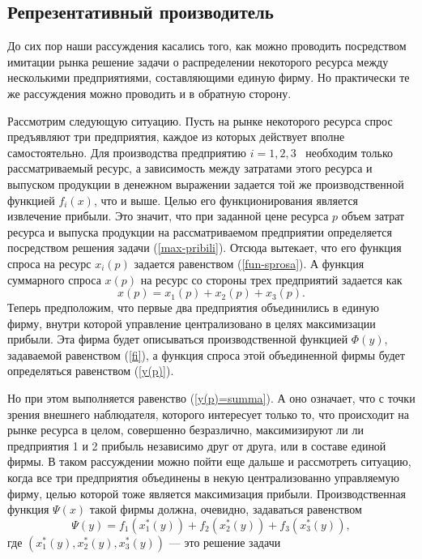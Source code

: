 \subsection{Репрезентативный производитель}

 До сих пор наши рассуждения касались того, как можно проводить
 посредством имитации рынка  решение задачи о распределении
 некоторого ресурса между несколькими
 предприятиями, составляющими единую фирму.
 Но практически те же рассуждения можно проводить и в обратную
 сторону.

 Рассмотрим следующую ситуацию. Пусть на рынке некоторого
  ресурса спрос предъявляют три
 предприятия, каждое из которых действует вполне самостоятельно.
 Для производства предприятию $i=1,2,3$ \ необходим только
 рассматриваемый ресурс, а зависимость между затратами этого ресурса
 и выпуском продукции в денежном выражении задается той же
 производственной функцией $f_{i}(x)$, что и выше. Целью его
 функционирования является извлечение прибыли. Это значит, что при
 заданной цене ресурса $p$ объем затрат ресурса и выпуска продукции
  на рассматриваемом предприятии определяется посредством решения
  задачи (\ref{max-pribili}). Отсюда вытекает, что его функция спроса
  на ресурс $x_{i}(p)$ задается равенством (\ref{fun-sprosa}). А
  функция суммарного спроса $x(p)$ на ресурс со стороны трех предприятий
  задается как
\begin{equation}
\label{summ spros}
  x(p)=x_{1}(p)+x_{2}(p)+x_{3}(p).
\end{equation}
  Теперь предположим, что первые два предприятия объединились в
  единую фирму, внутри которой управление централизовано в целях
  максимизации прибыли. Эта фирма будет описываться производственной
  функцией $\Phi(y)$, задаваемой равенством (\ref{fi}), а функция
  спроса этой объединенной фирмы будет определяться равенством
  (\ref{y(p)}).

  Но при этом выполняется равенство (\ref{y(p)=summa}). А оно означает,
  что с точки зрения внешнего наблюдателя, которого
  интересует только то, что происходит на рынке ресурса в целом,
  совершенно безразлично, максимизируют ли ли предприятия 1 и 2
  прибыль независимо друг от друга, или в составе единой фирмы. В
  таком рассуждении можно пойти еще дальше и рассмотреть ситуацию,
  когда все три предприятия объединены в некую централизованно
  управляемую фирму, целью которой тоже является максимизация
  прибыли. Производственная функция $\Psi(x)$ такой фирмы должна,
  очевидно, задаваться равенством
   \[\Psi(y)=f_{1}(x_{1}^{*}(y))+f_{2}(x_{2}^{*}(y))+f_{3}(x_{3}^{*}(y)),\]
   где $(x_{1}^{*}(y),x_{2}^{*}(y),x_{3}^{*}(y))$ --- это решение
    задачи


